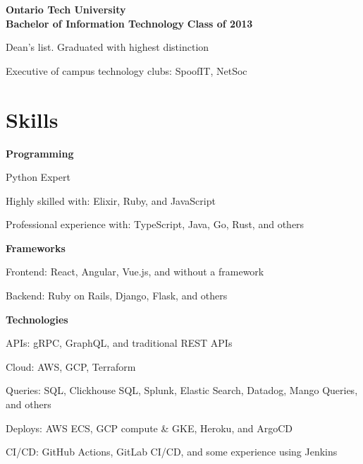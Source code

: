\documentclass[margin,line]{resume}
\begin{document}
\begin{resume}
    \hspace{-3mm}\textbf{\listing Ontario Tech University} \vspace{2mm}\\\vspace{1mm}%
    \hspace{2.4mm}\textbf{Bachelor of Information Technology} \hfill \textbf{Class of 2013}\vspace{1mm}%
    \begin{list2}
        \item Dean’s list. Graduated with highest distinction
        \item Executive of campus technology clubs: SpoofIT, NetSoc
    \end{list2}\vspace{-1.5mm}

\sectionline

    \section{\mysidestyle \textbf{\large{S}\small{kills}}}
    \hspace{2.4mm}\textbf{Programming}\vspace{1mm}
    \begin{list2}
        \item Python Expert
        \item Highly skilled with: Elixir, Ruby, and JavaScript
        \item Professional experience with: TypeScript, Java, Go, Rust, and others
    \end{list2}\vspace{-1.5mm}

    \hspace{2.4mm}\textbf{Frameworks}\vspace{1mm}
    \begin{list2}
        \item Frontend: React, Angular, Vue.js, and without a framework
        \item Backend: Ruby on Rails, Django, Flask, and others
    \end{list2}\vspace{-1.5mm}

    \hspace{2.4mm}\textbf{Technologies}\vspace{1mm}
    \begin{list2}
        \item APIs: gRPC, GraphQL, and traditional REST APIs
        \item Cloud: AWS, GCP, Terraform
        \item Queries: SQL, Clickhouse SQL, Splunk, Elastic Search, Datadog, Mango Queries, and others
        \item Deploys: AWS ECS, GCP compute \& GKE, Heroku, and ArgoCD
        \item CI/CD: GitHub Actions, GitLab CI/CD, and some experience using Jenkins
    \end{list2}\vspace{-1.5mm}


\end{resume}
\end{document}

